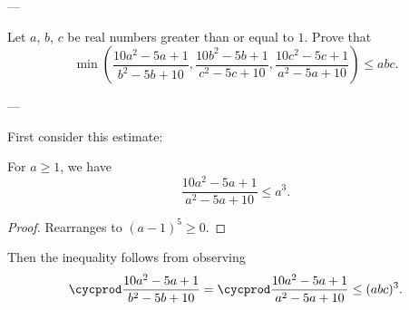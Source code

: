 
---

Let $a$, $b$, $c$ be real numbers greater than or equal to $1$. Prove that
\[\min\left(\frac{10a^2-5a+1}{b^2-5b+10},\frac{10b^2-5b+1}{c^2-5c+10},\frac{10c^2-5c+1}{a^2-5a+10}\right )\le abc.\]

---

First consider this estimate:
\begin{lemma*}
    For $a\ge1$, we have \[\frac{10a^2-5a+1}{a^2-5a+10}\le a^3.\]
\end{lemma*}
\begin{proof}
    Rearranges to $(a-1)^5\ge0$.
\end{proof}

Then the inequality follows from observing \[\cycprod\frac{10a^2-5a+1}{b^2-5b+10}=\cycprod\frac{10a^2-5a+1}{a^2-5a+10}\le(abc)^3.\]


